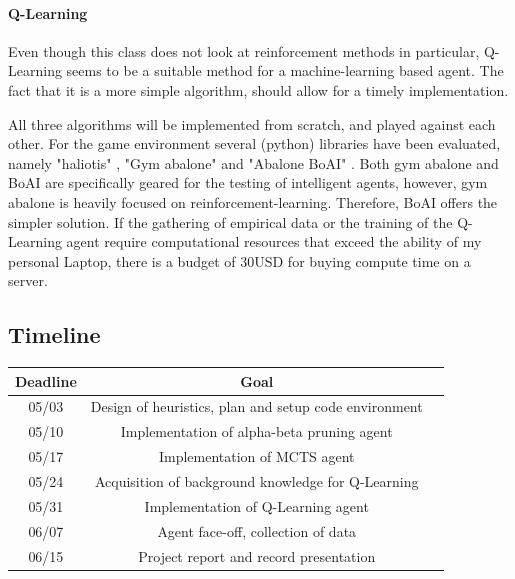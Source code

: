 \documentclass{llncs}
\begin{document}
\paragraph{Q-Learning}
Even though this class does not look at reinforcement methods in particular, Q-Learning seems to be a suitable method for a machine-learning based agent. The fact that it is a more simple algorithm, should allow for a timely implementation.

All three algorithms will be implemented from scratch, and played against each other. For the game environment several (python) libraries have been evaluated, namely "haliotis" \cite{noauthor_peer_nodate}, "Gym abalone" \cite{towzeur_towzeurgym-abalone_2021} and "Abalone BoAI" \cite{scriptim_scriptimabalone-boai_2021}. Both gym abalone and BoAI are specifically geared for the testing of intelligent agents, however, gym abalone is heavily focused on reinforcement-learning. Therefore, BoAI offers the simpler solution. If the gathering of empirical data or the training of the Q-Learning agent require computational resources that exceed the ability of my personal Laptop, there is a budget of 30USD for buying compute time on a server.

\subsection{Timeline}

\begin{table}
  \begin{center}
    \begin{tabular}{ | c | c | c | }
      \hline
      Deadline & Goal                                                  \\
      \hline
      05/03    & Design of heuristics, plan and setup code environment \\
      \hline
      05/10    & Implementation of alpha-beta pruning agent            \\
      \hline
      05/17    & Implementation of MCTS agent                          \\
      \hline
      05/24    & Acquisition of background knowledge for Q-Learning    \\
      \hline
      05/31    & Implementation of Q-Learning agent                    \\
      \hline
      06/07    & Agent face-off, collection of data                    \\
      \hline
      06/15    & Project report and record presentation                \\
      \hline
    \end{tabular}
  \end{center}
\end{table}
\end{document}

